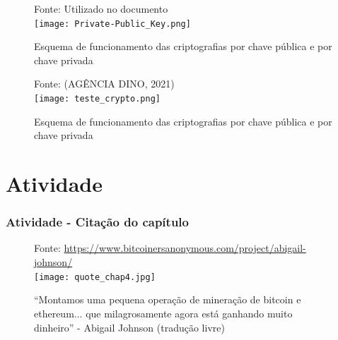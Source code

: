 \documentclass[aspectratio=43,8pt]{beamer}%
\begin{document}
\begin{frame}[noframenumbering]
	\begin{figure}
		\centering
		{\footnotesize Fonte: Utilizado no documento}\\
		\texttt{[image: Private-Public\_Key.png]}
		\caption{Esquema de funcionamento das criptografias por chave pública e por chave privada}
	\end{figure}
\end{frame}
\begin{frame}[noframenumbering]
\begin{figure}
	\centering
	{\footnotesize Fonte: (AGÊNCIA DINO, 2021)}\\
	\texttt{[image: teste\_crypto.png]}
	\caption{Esquema de funcionamento das criptografias por chave pública e por chave privada}
\end{figure}
\end{frame}



\section{Atividade}

\begin{frame}
	\frametitle{Atividade - Citação do capítulo}
	
	\begin{figure}
		\centering
		{\footnotesize Fonte:  \url{https://www.bitcoinersanonymous.com/project/abigail-johnson/}}\\
		\texttt{[image: quote\_chap4.jpg]}
		\caption{``Montamos uma pequena operação de
			mineração de bitcoin e ethereum... que
			milagrosamente agora está ganhando muito
			dinheiro'' - Abigail Johnson
			(tradução livre)}
	\end{figure}
\end{frame}
\end{document}
